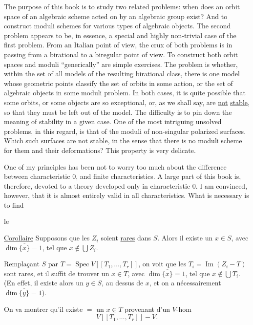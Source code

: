 The purpose of this book is to study two related problems: when does an orbit space of an algebraic scheme acted on by an algebraic group exist? And to construct moduli schemes for various types of algebraic objects. The second problem appears to be, in essence, a special and highly non-trivial case of the first problem. From an Italian point of view, the crux of both problems is in passing from a birational to a biregular point of view. To construct both orbit spaces and moduli ``generically'' are simple exercises. The problem is whether, within the set of all models of the resulting birational class, there is one model whose geometric points classify the set of orbits in some action, or the set of algebraic objects in some moduli problem. In both cases, it is quite possible that some orbits, or some objects are so exceptional, or, as we shall say, are \uline{not} \uline{stable}, so that they must be left out of the model. The difficulty is to pin down the meaning of stability in a given case. One of the most intriguing unsolved problems, in this regard, is that of the moduli of non-singular polarized surfaces. Which such surfaces are not stable, in the sense that there is no moduli scheme for them and their deformations? This property is very delicate.

One of my principles has been not to worry too much about the difference between characteristic $0$, and finite characteristics. A large part of this book is, therefore, devoted to a theory developed only in characteristic $0$. I am convinced, however, that it is almost entirely valid in all characteristics. What is necessary is to find


le

\uline{Corollaire} Supposons que les $Z_i$ soient \uline{rares} dans $S$. Alors il existe un $x\in S$, avec $\dim\overline{\{x\}}=1$, tel que $x\notin\bigcup Z_i$.

Remplaçant $S$ par $T=\operatorname{Spec}V[[T_1,\ldots,T_r]]$,  on voit que les $T_i=\operatorname{Im}(Z_i\mathbin{-}T)$ sont rares, et il suffit de trouver un $x\in T$, avec $\dim\overline{\{x\}}=1$, tel que $x\notin\bigcup T_i$. (En effet, il existe alors un $y\in S$, au dessus de $x$, et on a nécessairement $\dim\overline{\{y\}}=1$).

On va montrer qu'il existe $=$ un $x\in T$ provenant d'un $V$-hom
\[
V[[T_1,\ldots,T_r]]\mathbin{-}V.
\]

